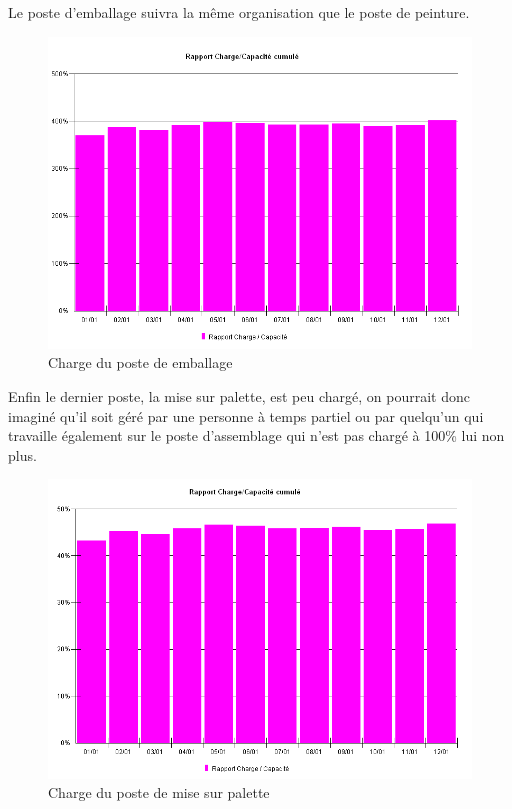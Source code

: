 \documentclass[a4paper]{../TPInsa}
\begin{document}
	Le poste d'emballage suivra la même organisation que le poste de peinture. 
	\begin{figure}[H]
	\centering
	\includegraphics[scale=0.6]{captures/charge_emb.PNG}
	\caption{Charge du poste de emballage}
	\end{figure}
	
	Enfin le dernier poste, la mise sur palette, est peu chargé, on pourrait donc imaginé qu'il soit géré par une personne à temps partiel ou par quelqu'un qui travaille également sur le poste d'assemblage qui n'est pas chargé à 100\% lui non plus.
	\begin{figure}[H]
	\centering
	\includegraphics[scale=0.6]{captures/charge_pal.PNG}
	\caption{Charge du poste de mise sur palette}
	\end{figure}
\end{document}
